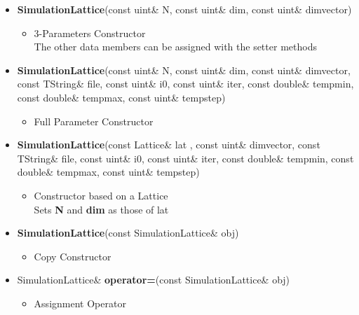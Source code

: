 \begin{itemize}
\begin{itemize}
			\item[] \textbf{SimulationLattice}(const uint\& \textunderscore N, const uint\& \textunderscore dim, const uint\& \textunderscore dim\textunderscore vector)		 
			\begin{itemize}
				\item[] 3-Parameters Constructor \\
						The other data members can be assigned with the setter methods
			\end{itemize}
			
			\item[] \textbf{SimulationLattice}(const uint\& \textunderscore N, const uint\& \textunderscore dim, const uint\& \textunderscore dim\textunderscore vector, const TString\& \textunderscore file, const uint\& \textunderscore i0, const uint\& \textunderscore iter, const double\& \textunderscore tempmin, const double\& \textunderscore tempmax, const uint\& \textunderscore tempstep)		 
			\begin{itemize}
				\item[] Full Parameter Constructor
			\end{itemize}

			\item[] \textbf{SimulationLattice}(const Lattice\& \textunderscore lat , const uint\& \textunderscore dim\textunderscore vector, const TString\& \textunderscore file, const uint\& \textunderscore i0, const uint\& \textunderscore iter, const double\& \textunderscore tempmin, const double\& \textunderscore tempmax, const uint\& \textunderscore tempstep)			 
			\begin{itemize}
				\item[] Constructor based on a Lattice  \\
						Sets \textbf{N} and \textbf{dim} as those of lat    
			\end{itemize}
			
			\item[] \textbf{SimulationLattice}(const SimulationLattice\& obj)		 
			\begin{itemize}
				\item[] Copy Constructor
			\end{itemize}
			
			\item[] SimulationLattice\& \textbf{operator=}(const SimulationLattice\& obj)		 
			\begin{itemize}
				\item[] Assignment Operator
			\end{itemize}
		

\end{itemize}
\end{itemize}
